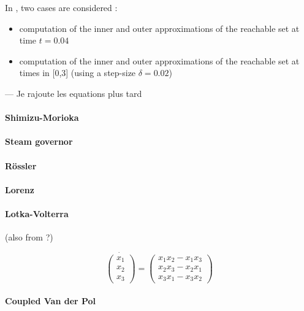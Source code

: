 \documentclass{sig-alternate-05-2015} %
\newcommand\ForAuthors[1]%
 {\par\smallskip                     %
  \begin{center}%
   \fbox%
   {\parbox{0.9\linewidth}%
    {\raggedright\sc--- #1}%
   }%
  \end{center}%
  \par\smallskip                     %
 }
\begin{document}
In \cite{Underapproxflowpipes}, two cases are considered : 
\begin{itemize}
\item computation of the inner and outer approximations of the reachable set at time
$t=0.04$
\item computation of the inner and outer approximations of the reachable set at times
in [0,3] (using a step-size $\delta=0.02$)
\end{itemize}

\ForAuthors{Je rajoute les equations plus tard}

\paragraph{Shimizu-Morioka}

\paragraph{Steam governor}

\paragraph{R\"ossler}


\paragraph{Lorenz}

\paragraph{Lotka-Volterra}
(also from \cite{underapprox16}?)

\begin{equation}
\dot{\left(\begin{array}{c}
x_1 \\
x_2 \\
x_3
\end{array}\right)} = \left(\begin{array}{c}
x_1x_2-x_1x_3 \\
x_2x_3-x_2x_1 \\
x_3x_1-x_3x_2
\end{array}\right)
\end{equation}

\paragraph{Coupled Van der Pol}
\end{document}

